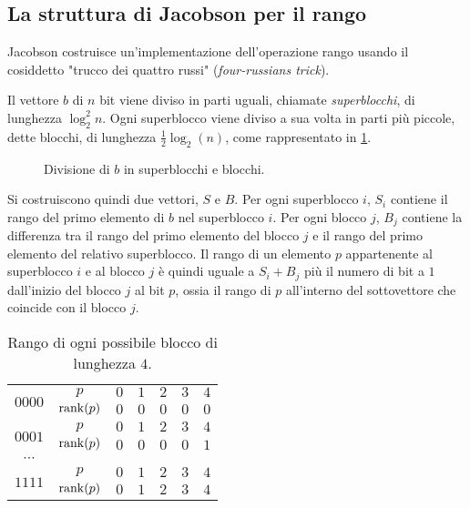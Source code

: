 \subsection{La struttura di Jacobson per il rango}
Jacobson costruisce un'implementazione dell'operazione rango usando il cosiddetto "trucco dei quattro russi" (\textit{four-russians trick}).

Il vettore $b$ di $n$ bit viene diviso in parti uguali, chiamate \emph{superblocchi}, di lunghezza $\log_2^2 n$.
Ogni superblocco viene diviso a sua volta in parti più piccole, dette blocchi, di lunghezza $\frac{1}{2}\log_2(n)$, come rappresentato in \cref{fig:jrank}.

\begin{figure}[ht]
	\centering
	
	\caption{Divisione di $b$ in superblocchi e blocchi.}
	\label{fig:jrank}
\end{figure}

Si costruiscono quindi due vettori, $S$ e $B$. Per ogni superblocco $i$, $S_i$ contiene il rango del primo elemento di $b$ nel superblocco $i$. Per ogni blocco $j$, $B_j$ contiene la differenza tra il rango del primo elemento del blocco $j$ e il rango del primo elemento del relativo superblocco. Il rango di un elemento $p$ appartenente al superblocco $i$ e al blocco $j$ è quindi uguale a $S_i+B_j$ più il numero di bit a $1$ dall'inizio del blocco $j$ al bit $p$, ossia il rango di $p$ all'interno del sottovettore che coincide con il blocco $j$.

\begin{table}
	\centering
	\begin{tabular}{|c|c|c|c|c|c|c|}
		\hline
		\multirow{2}{*}{$0000$} & $p$        & $0$ & $1$ & $2$ & $3$ & $4$ \\ \cline{2-7}
		                        & $\mathrm{rank}(p)$ & $0$ & $0$ & $0$ & $0$ & $0$ \\ \hline
		\multirow{2}{*}{$0001$} & $p$        & $0$ & $1$ & $2$ & $3$ & $4$ \\ \cline{2-7}
		                        & $\mathrm{rank}(p)$ & $0$ & $0$ & $0$ & $0$ & $1$ \\ \hline
		$\cdots$                &            &     &     &     &     &     \\ \hline
		\multirow{2}{*}{$1111$} & $p$        & $0$ & $1$ & $2$ & $3$ & $4$ \\ \cline{2-7}
		                        & $\mathrm{rank}(p)$ & $0$ & $1$ & $2$ & $3$ & $4$ \\ \hline
	\end{tabular}
	\caption{Rango di ogni possibile blocco di lunghezza $4$.}
	\label{table:example_rank_block4}
\end{table}


